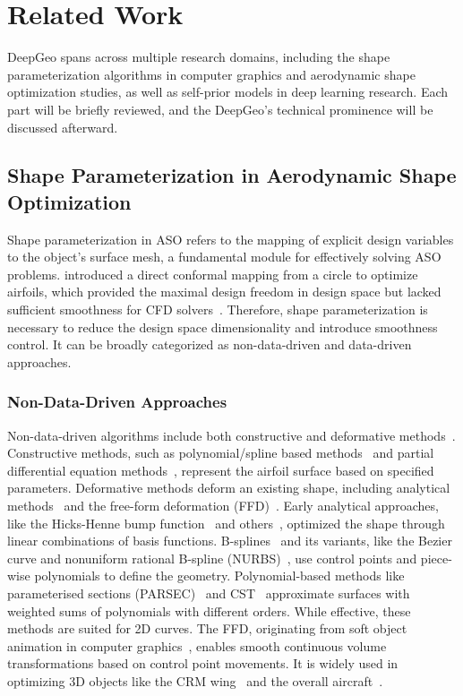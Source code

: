 \section{Related Work}
\label{ch5:sec:related_work}

DeepGeo spans across multiple research domains, including the shape parameterization algorithms in computer graphics and aerodynamic shape optimization studies, as well as self-prior models in deep learning research. Each part will be briefly reviewed, and the DeepGeo's technical prominence will be discussed afterward.

\subsection{Shape Parameterization in Aerodynamic Shape Optimization}
Shape parameterization in ASO refers to the mapping of explicit design variables to the object's surface mesh, a fundamental module for effectively solving ASO problems. \citet{aa.Jameson1988} introduced a direct conformal mapping from a circle to optimize airfoils, which provided the maximal design freedom in design space but lacked sufficient smoothness for CFD solvers~\cite{aa.Braibant1984}. Therefore, shape parameterization is necessary to reduce the design space dimensionality and introduce smoothness control. It can be broadly categorized as non-data-driven and data-driven approaches. 

\subsubsection{Non-Data-Driven Approaches}

Non-data-driven algorithms include both constructive and deformative methods~\cite{aa.Masters2017}. Constructive methods, such as polynomial/spline based methods~\cite{aa.Kulfan2008,aa.Braibant1984,aa.Farin1995} and partial differential equation methods~\cite{aa.Bloor1995,aa.Smith1995}, represent the airfoil surface based on specified parameters. Deformative methods deform an existing shape, including analytical methods~\cite{aa.Hicks1978,aa.Pickett1973,aa.Hager1992} and the free-form deformation (FFD)~\cite{aa.Sederberg1986, aa.Lamousin1994, aa.Kenway2010}. Early analytical approaches, like the Hicks-Henne bump function~\cite{aa.Hicks1978} and others~\cite{aa.Pickett1973,aa.Hager1992}, optimized the shape through linear combinations of basis functions. B-splines~\cite{aa.Braibant1984} and its variants, like the Bezier curve and nonuniform rational B-spline (NURBS)~\cite{aa.Farin1995}, use control points and piece-wise polynomials to define the geometry. Polynomial-based methods like parameterised sections (PARSEC)~\cite{aa.Sobieczky1999} and CST~\cite{aa.Kulfan2008} approximate surfaces with weighted sums of polynomials with different orders. While effective, these methods are suited for 2D curves. The FFD, originating from soft object animation in computer graphics~\cite{aa.Sederberg1986,ai.Barr1984,aa.Lamousin1994}, enables smooth continuous volume transformations based on control point movements. It is widely used in optimizing 3D objects like the CRM wing~\cite{aa.Lyu2015,aa.Wu2022} and the overall aircraft~\cite{aa.Secco2021}.

